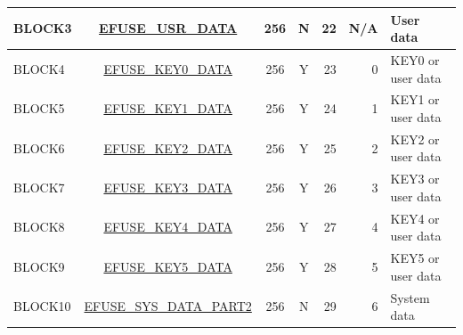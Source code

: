 \begin{longtable}[c]{ |l|c|c|c|r|r|l| }
    BLOCK3 & \hyperref[fielddesc:EFUSEUSRDATA0]{EFUSE\_USR\_DATA} & 256 & N & 22 & N/A & User data \\\hline
    BLOCK4 & \hyperref[fielddesc:EFUSEKEY0DATA0]{EFUSE\_KEY0\_DATA} & 256 & Y & 23 & 0 & KEY0 or user data \\
    \hline
    BLOCK5 & \hyperref[fielddesc:EFUSEKEY1DATA0]{EFUSE\_KEY1\_DATA} & 256 & Y & 24 & 1 & KEY1 or user data \\
    \hline
    BLOCK6 & \hyperref[fielddesc:EFUSEKEY2DATA0]{EFUSE\_KEY2\_DATA} & 256 & Y & 25 & 2 & KEY2 or user data \\
    \hline
    BLOCK7 & \hyperref[fielddesc:EFUSEKEY3DATA0]{EFUSE\_KEY3\_DATA} & 256 & Y & 26 & 3 & KEY3 or user data \\
    \hline
    BLOCK8 & \hyperref[fielddesc:EFUSEKEY4DATA0]{EFUSE\_KEY4\_DATA} & 256 & Y & 27 & 4 & KEY4 or user data \\
    \hline
    BLOCK9 & \hyperref[fielddesc:EFUSEKEY5DATA0]{EFUSE\_KEY5\_DATA} & 256 & Y & 28 & 5 & KEY5 or user data \\
    \hline
    BLOCK10 & \hyperref[fielddesc:EFUSESYSDATAPART20]{EFUSE\_SYS\_DATA\_PART2} & 256 & N & 29 & 6 & System data \\
    \hline
\end{longtable}
